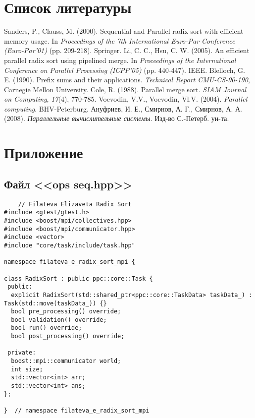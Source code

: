 \documentclass[a4paper, 14pt]{article}
\begin{document}
		\newpage
	\section*{\centering Список литературы}
	
    \begin{thebibliography}{9}
          Sanders, P.,  Clauss, M. (2000). Sequential and Parallel radix sort with efficient memory usage. In \textit{Proceedings of the 7th International Euro-Par Conference (Euro-Par'01)} (pp. 209-218). Springer.
          Li, C. C.,  Hsu, C. W. (2005). An efficient parallel radix sort using pipelined merge. In \textit{Proceedings of the International Conference on Parallel Processing (ICPP'05)} (pp. 440-447). IEEE.
         Blelloch, G. E. (1990). Prefix sums and their applications. \textit{Technical Report CMU-CS-90-190}, Carnegie Mellon University.
         Cole, R. (1988). Parallel merge sort. \textit{SIAM Journal on Computing}, \textit{17}(4), 770-785.
         Voevodin, V.V.,  Voevodin, Vl.V. (2004). \textit{Parallel computing}. BHV-Peterburg.
         Ануфриев, И. Е., Смирнов, А. Г., Смирнов, А. А. (2008). \textit{Параллельные вычислительные системы}. Изд-во С.-Петерб. ун-та.
    \end{thebibliography}
	
	\newpage
	\section*{\centering Приложение}
	\subsection*{\centering Файл <<ops seq.hpp>>}
	\begin{verbatim}
	// Filateva Elizaveta Radix Sort
#include <gtest/gtest.h>
#include <boost/mpi/collectives.hpp>
#include <boost/mpi/communicator.hpp>
#include <vector>
#include "core/task/include/task.hpp"

namespace filateva_e_radix_sort_mpi {

class RadixSort : public ppc::core::Task {
 public:
  explicit RadixSort(std::shared_ptr<ppc::core::TaskData> taskData_) : Task(std::move(taskData_)) {}
  bool pre_processing() override;
  bool validation() override;
  bool run() override;
  bool post_processing() override;

 private:
  boost::mpi::communicator world;
  int size;
  std::vector<int> arr;
  std::vector<int> ans;
};

}  // namespace filateva_e_radix_sort_mpi
	\end{verbatim}
\end{document}
